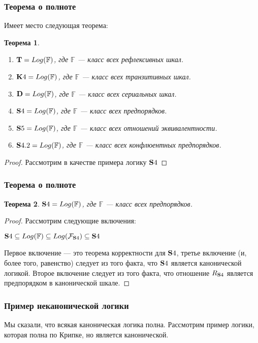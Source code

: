 \documentclass[pdf,utf8,russian,aspectratio=169]{beamer}
\newtheorem{theor}{Теорема}
\begin{document}
\begin{frame}
  \frametitle{Теорема о полноте}

  Имеет место следующая теорема:

\begin{theor}
  \begin{enumerate}
    \item ${\bf T} = Log(\mathbb{F})$, где $\mathbb{F}$ --- класс всех рефлексивных шкал.
    \item ${\bf K}4 = Log(\mathbb{F})$, где $\mathbb{F}$ --- класс всех транзитивных шкал.
    \item ${\bf D} = Log(\mathbb{F})$, где $\mathbb{F}$ --- класс всех сериальных шкал.
    \item ${\bf S}4 = Log(\mathbb{F})$, где $\mathbb{F}$ --- класс всех предпорядков.
    \item ${\bf S}5 = Log(\mathbb{F})$, где $\mathbb{F}$ --- класс всех отношений эквивалентности.
    \item ${\bf S}4.2 = Log(\mathbb{F})$, где $\mathbb{F}$ --- класс всех конфлюентных предпорядков.
  \end{enumerate}
\end{theor}

\begin{proof}
  Рассмотрим в качестве примера логику ${\bf S}4$
\end{proof}
\end{frame}

\begin{frame}
  \frametitle{Теорема о полноте}
  \begin{theor}
    ${\bf S}4 = Log(\mathbb{F})$, где $\mathbb{F}$ --- класс всех предпорядков.
  \end{theor}
  \begin{proof}
    Рассмотрим следующие включения:

    ${\bf S}4 \subseteq Log(\mathbb{F}) \subseteq Log(\mathcal{F}_{{\bf S}4}) \subseteq {\bf S}4$

    Первое включение --- это теорема корректности для ${\bf S}4$, третье включение (и, более того, равенство) следует из того факта, что ${\bf S}4$ является канонической логикой. Второе включение следует из того факта, что отношение $R_{{\bf S}4}$ является предпорядком в канонической шкале.
  \end{proof}
\end{frame}

\begin{frame}
  \frametitle{Пример неканонической логики}

  Мы сказали, что всякая каноническая логика полна. Рассмотрим пример логики, которая полна по Крипке, но является канонической.
\end{frame}
\end{document}
